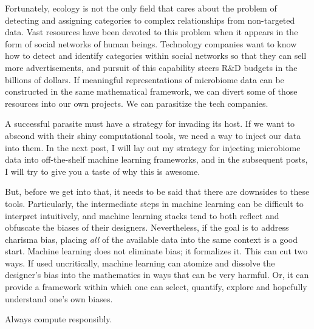 \documentclass[
10pt, %
a4paper, %
oneside, %
headinclude,footinclude, %
BCOR5mm, %
]{scrartcl}
\begin{document}
Fortunately, ecology is not the only field that cares about the problem of detecting and assigning categories to complex relationships from non-targeted data. Vast resources have been devoted to this problem when it appears in the form of social networks of human beings. Technology companies want to know how to detect and identify categories within social networks so that they can sell more advertisements, and pursuit of this capability steers R\&D budgets in the billions of dollars. If meaningful representations of microbiome data can be constructed in the same mathematical framework, we can divert some of those resources into our own projects. We can parasitize the tech companies.

A successful parasite must have a strategy for invading its host. If we want to abscond with their shiny computational tools, we need a way to inject our data into them. In the next post, I will lay out my strategy for injecting microbiome data into off-the-shelf machine learning frameworks, and in the subsequent posts, I will try to give you a taste of why this is awesome.


But, before we get into that, it needs to be said that there are downsides to these tools. Particularly, the intermediate steps in machine learning can be difficult to interpret intuitively, and machine learning stacks tend to both reflect and obfuscate the biases of their designers. Nevertheless, if the goal is to address charisma bias, placing {\em all} of the available data into the same context is a good start. Machine learning does not eliminate bias; it formalizes it. This can cut two ways. If used uncritically, machine learning can atomize and dissolve the designer's bias into the mathematics in ways that can be very harmful. Or, it can provide a framework within which one can select, quantify, explore and hopefully understand one's own biases.

Always compute responsibly.
\end{document}
